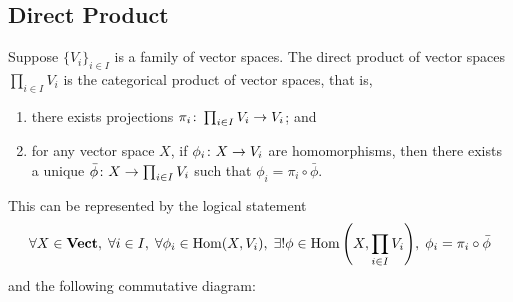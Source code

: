 

\subsection*{Direct Product}

\begin{definition}
    Suppose \({\{V_i\}}_{i \in I}\) is a family of vector spaces.
    The direct product of vector spaces \(\prod_{i \in I} V_i\)
    is the categorical product of vector spaces, that is,
    \begin{enumerate}[label={(\roman*)}, itemsep=0mm]
        \item there exists projections \(\pi_i\colon\prod_{i \in I} V_i\to V_i\); and
        \item for any vector space \(X\), if \(\phi_i\colon X\to V_i\) are homomorphisms,
            then there exists a unique \(\bar{\phi}\colon X\to\prod_{i \in I} V_i\)
            such that \(\phi_i = \pi_i\circ\bar{\phi}\).
    \end{enumerate}

    This can be represented by the logical statement
    \begin{equation*}
        \forall X \in \mathbf{Vect},\;
        \forall i \in I,\;
        \forall \phi_i \in \operatorname{Hom}(X,V_i),\;
        \exists! \phi \in \operatorname{Hom}\qty(X,\prod_{i \in I} V_i),\;
        \phi_i = \pi_i \circ \bar{\phi}
    \end{equation*}
    and the following commutative diagram:
    \begin{center}
    \end{center}
\end{definition}

